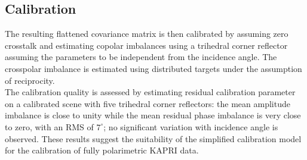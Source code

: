 \subsection{Calibration}
The resulting flattened covariance matrix is then calibrated  by assuming zero crosstalk and estimating copolar imbalances using a trihedral corner reflector assuming the parameters to be independent from the  incidence angle. The crosspolar imbalance is estimated using distributed targets under the assumption of reciprocity.\\
The calibration quality is assessed by estimating residual calibration parameter on a calibrated scene with five trihedral corner reflectors: the mean amplitude imbalance is close to unity while the mean residual phase imbalance is very close to zero, with an RMS of $7^\circ$; no significant variation with incidence angle is observed. These results suggest the suitability of the simplified calibration model for the calibration of fully polarimetric KAPRI data.
